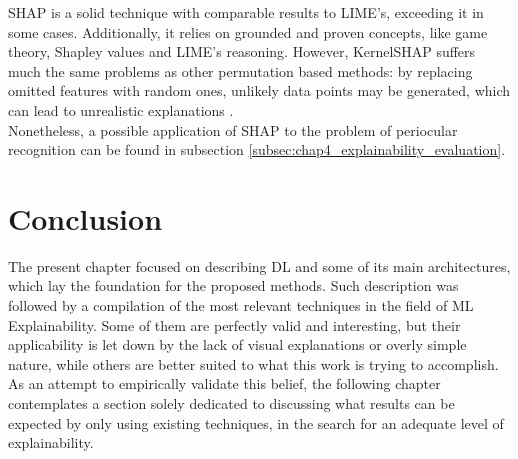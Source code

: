 \ac{SHAP} is a solid technique with comparable results to \ac{LIME}'s, exceeding it in some cases. Additionally, it relies on grounded and proven concepts, like game theory, Shapley values and \ac{LIME}'s reasoning. However, Kernel\ac{SHAP} suffers much the same problems as other permutation based methods: by replacing omitted features with random ones, unlikely data points may be generated, which can lead to unrealistic explanations \cite{molnar2019}. \\

Nonetheless, a possible application of \ac{SHAP} to the problem of periocular recognition can be found in subsection \ref{subsec:chap4_explainability_evaluation}.

\section{Conclusion}
\label{sec:chap2_conclusion}

The present chapter focused on describing \ac{DL} and some of its main architectures, which lay the foundation for the proposed methods. Such description was followed by a compilation of the most relevant techniques in the field of \ac{ML} Explainability. Some of them are perfectly valid and interesting, but their applicability is let down by the lack of visual explanations or overly simple nature, while others are better suited to what this work is trying to accomplish. As an attempt to empirically validate this belief, the following chapter contemplates a section solely dedicated to discussing what results can be expected by only using existing techniques, in the search for an adequate level of explainability.